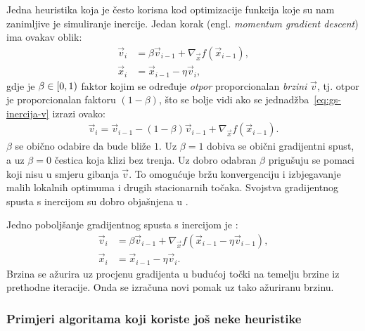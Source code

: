 \documentclass[utf8, diplomski, lmodern]{fer}
\begin{document}
Jedna heuristika koja je često korisna kod optimizacije funkcija koje su nam zanimljive je simuliranje inercije. Jedan korak  (engl. \textit{momentum gradient descent}) ima ovakav oblik:
\begin{align}
\vec v_i &= \beta\vec v_{i-1} + \nabla_{\vec x}f(\vec x_{i-1}), \label{eq:gs-inercija-v}\\
\vec x_i &= \vec x_{i-1} - \eta\vec v_i \text{,}
\end{align}
gdje je $\beta\in\intco{0,1}$ faktor kojim se određuje \textit{otpor} proporcionalan \textit{brzini} $\vec v$, tj. otpor je proporcionalan faktoru $(1-\beta)$, što se bolje vidi ako se jednadžba~\eqref{eq:gs-inercija-v} izrazi ovako: 
\begin{align}
\vec v_i = \vec v_{i-1} - (1-\beta)\vec v_{i-1} + \nabla_{\vec x}f(\vec x_{i-1}) \text{.}
\end{align}
$\beta$ se obično odabire da bude bliže $1$. Uz $\beta=1$ dobiva se obični gradijentni spust, a uz $\beta=0$ čestica koja klizi bez trenja. Uz dobro odabran $\beta$ prigušuju se pomaci koji nisu u smjeru gibanja $\vec v$. To omogućuje bržu konvergenciju i izbjegavanje malih lokalnih optimuma i drugih stacionarnih točaka. Svojstva gradijentnog spusta s inercijom su dobro objašnjena u \citet{GOH:2017:WMRW}.

Jedno poboljšanje gradijentnog spusta s inercijom je  \citep{Nesterov:2014:ILCOBC,Sutskever:2013:TRNN}:
\begin{align}
\vec v_i &= \beta\vec v_{i-1} + \nabla_{\vec x}f(\vec x_{i-1} - \eta\vec v_{i-1}), \\
\vec x_i &= \vec x_{i-1} - \eta\vec v_i \text{.}
\end{align}
Brzina se ažurira uz procjenu gradijenta u budućoj točki na temelju brzine iz prethodne iteracije. Onda se izračuna novi pomak uz tako ažuriranu brzinu.

\subsubsection{Primjeri algoritama koji koriste još neke heuristike}
\end{document}
